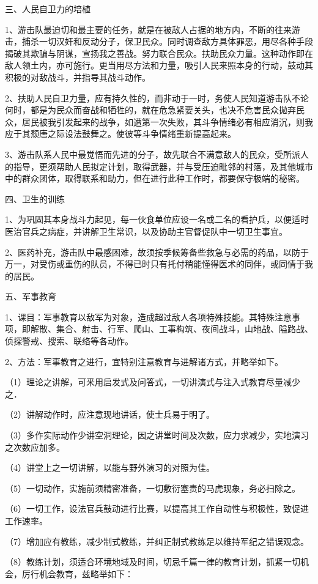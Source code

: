 三、人民自卫力的培植

1、游击队最迫切和最主要的任务，就是在被敌人占据的地方内，不断的往来游击，捕杀一切汉奸和反动分子，保卫民众。同时调查敌方具体罪恶，用尽各种手段揭破其欺骗与阴谋，宣扬我之善战。努力联合民众。扶助民众力量。这种动作即在敌人领土内，亦可施行。更当用尽方法和力量，吸引人民来照本身的行动，鼓动其积极的对敌战斗，并指导其战斗动作。

2、扶助人民自卫力量，应有持久性的，而非动于一时，务使人民知道游击队不论何时，都是为民众而奋战和牺牲的，就在危急紧要关头，也决不危害民众拋弃民众，居民被我引发起来的战争，如遭第一次失败，其斗争情绪必有相应消沉，则我应于其颓唐之际设法鼓舞之。使彼等斗争情绪重新提高起来。

3、游击队系人民中最觉悟而先进的分子，故先联合不满意敌人的民众，受所派人的指导，更须帮助人民拟定计划，取得武器，并与受压迫毗邻的村落，及其他城市中的群众团体，取得联系和助力，但在进行此种工作时，都要保守极端的秘密。

四、卫生的训练

1、为巩固其本身战斗力起见，每一伙食单位应设一名或二名的看护兵，以便适时医治官兵之病症，并讲解卫生常识，以及协助主官督促队中一切卫生事宜。

2、医药补充，游击队中最感困难，故须按季候筹备些救急与必需的药品，以防于万一，对受伤或重伤的队员，不得已时只有托付稍能懂得医术的同伴，或同情于我的居民。

五、军事教育

1、课目：军事教育以敌军为对象，造成超过敌人各项特殊技能。其特殊注意事项，即解散、集合、射击、行军、爬山、工事构筑、夜间战斗，山地战、隘路战、侦探警戒、搜索、联络等各动作。

2、方法：军事教育之进行，宜特别注意教育与进解诸方式，并略举如下。

（1）理论之讲解，可釆用启发式及问答式，一切讲演式与注入式教育尽量减少之．

（2）讲解动作时，应注意现地讲话，使士兵易于明了。

（3）多作实际动作少讲空洞理论，因之讲堂时间及次数，应力求减少，实地演习之次数应加多。

（4）讲堂上之一切讲解，以能与野外演习的对照为佳。

（5）一切动作，实施前须精密准备，一切敷衍塞责的马虎现象，务必扫除之。

（6）一切工作，设法官兵鼓动进行比赛，以提高其工作自动性与积极性，致促进工作速率。

（7）增加应有教练，减少制式教练，并纠正制式教练足以维持军纪之错误观念。

（8）教练计划，须适合环境地域及时间，切忌千篇一律的教育计划，抓紧一切机会，厉行机会教育，兹略举如下：

